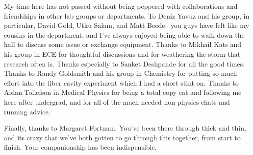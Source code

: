 My time here has not passed without being peppered with collaborations and friendships in other lab groups or departments. To Deniz Yavuz and his group, in particular, David Gold, Utku Salam, and Matt Beede-- you guys have felt like my cousins in the department, and I've always enjoyed being able to walk down the hall to discuss some issue or exchange equipment. Thanks to Mikhail Kats and his group in ECE for thoughtful discussions and for weathering the storm that research often is. Thanks especially to Sanket Deshpande for all the good times. Thanks to Randy Goldsmith and his group in Chemistry for putting so much effort into the fiber cavity experiment which I had a short stint on. Thanks to Aidan Tollefson in Medical Physics for being a total copy cat and following me here after undergrad, and for all of the much needed non-physics chats and running advice.

Finally, thanks to Margaret Fortman. You've been there through thick and thin, and its crazy that we've both gotten to go through this together, from start to finish. Your companionship has been indispensible.

